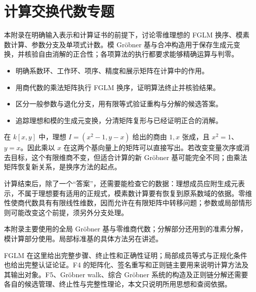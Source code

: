 
\chapter{计算交换代数专题}
\label{b3:app:B}

\begin{chapterabstract}
	本附录在明确输入表示和计算证书的前提下，讨论零维理想的 FGLM 换序、模素数计算、参数分支及单项式计数。模 Gröbner 基与合冲构造用于保存生成元变换，并核验自由消解的正合性；各项算法的执行都要求能够精确运算与判零。
\end{chapterabstract}

\begin{learninggoals}
	\begin{itemize}
		\item 明确系数环、工作环、项序、精度和展示矩阵在计算中的作用。
		\item 用商代数的乘法矩阵执行 FGLM 换序，证明算法终止并核验结果。
		\item 区分一般参数与退化分支，用有限等式验证重构与分解的候选答案。
		\item 追踪理想和模的生成元变换，分清矩阵复形与已经证明正合的消解。
	\end{itemize}
\end{learninggoals}

在 \(k[x,y]\) 中，理想 \(I=(x^2-1,y-x)\) 给出的商由 \(1,x\) 张成，且 \(x^2=1\)、\(y=x\)。因此乘以 \(x\) 在这两个基向量上的矩阵可以直接写出。若改变变量次序或消去目标，这个有限维商不变，但适合计算的新 Gröbner 基可能完全不同；由乘法矩阵恢复新关系，是换序方法的起点。

\ProseParagraphBreak

计算结束后，除了一个“答案”，还需要能检查它的数据：理想成员应附生成元表示，不属于理想要有适用的正规式，模素数计算要有恢复到原系数域的依据。零维性使商代数具有有限线性维数，因而允许在有限矩阵中转移问题；参数或局部情形则可能改变这个前提，须另外分支处理。

\ProseParagraphBreak

本附录主要使用的全局 Gröbner 基与零维商代数；分解部分还用到的准素分解，模计算部分使用。局部标准基的具体方法另在讲述。

FGLM 在这里给出完整步骤、终止性和正确性证明；局部成员等式与正规化条件也给出完整认证论证。F4 的矩阵化、签名重写和正则链主要用来说明计算方法及其输出对象。F5、Gröbner walk、综合 Gröbner 系统的构造及正则链分解还需要各自的候选管理、终止性与完整性理论，本文只说明所用思想和查阅依据。

